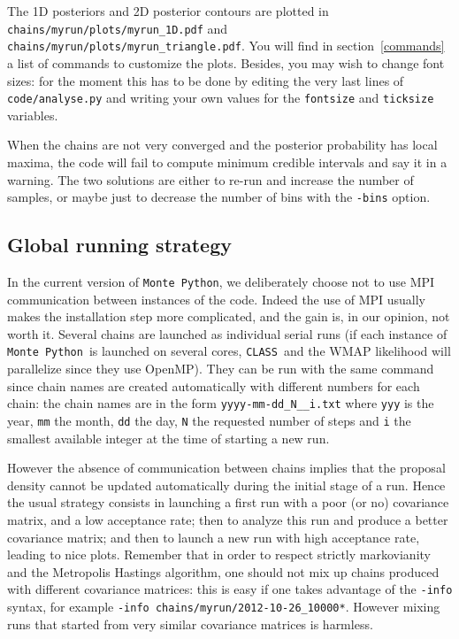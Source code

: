 \documentclass[10pt]{article}
\newcommand{\CLASS}{\texttt{CLASS}}
\newcommand{\MP}{\texttt{Monte Python}}
\begin{document}
The 1D posteriors and 2D posterior contours are plotted in \verb?chains/myrun/plots/myrun_1D.pdf? and \verb?chains/myrun/plots/myrun_triangle.pdf?. You will find in section~\ref{commands} a list of commands to customize the plots. Besides, you may wish to change font sizes: for the moment this has to be done by editing the very last lines of \verb?code/analyse.py? and writing your own values for the \verb?fontsize? and \verb?ticksize? variables.

When the chains are not very converged and the posterior probability has local maxima, the code will fail to compute minimum credible intervals and say it in a warning. The two solutions are either to re-run and increase the number of samples, or maybe just to decrease the number of bins with the \verb?-bins? option.

\subsection{Global running strategy}
     
In the current version of \MP, we deliberately  choose not to use MPI communication between instances of the code. Indeed the use of MPI usually makes the installation step more complicated, and the gain is, in our opinion, not worth it. Several chains are launched as individual serial runs (if each instance of \MP~is launched on several cores, \CLASS~and the WMAP likelihood will parallelize since they use OpenMP). They can be run with the same command since chain names  are created automatically with different numbers for each chain: the chain names are in  the form
\verb?yyyy-mm-dd_N__i.txt? where {\tt yyy} is the year, {\tt mm} the month, {\tt dd} the day, {\tt N} the requested number of steps and {\tt i} the smallest available integer at the time of starting a new run.

However the absence of communication between chains implies that the proposal density cannot be updated automatically during the initial stage of a run. Hence the usual strategy consists in launching a first run with a poor (or no) covariance matrix, and a low acceptance rate; then to analyze this run and produce a better covariance matrix; and then to launch a new run with high acceptance rate, leading to nice plots. Remember that in order to respect strictly markovianity and the Metropolis Hastings algorithm, one should not mix up chains produced with different covariance matrices: this is easy if one takes advantage of the \verb?-info? syntax, for example \verb?-info chains/myrun/2012-10-26_10000*?. However mixing runs that started from very similar covariance matrices is harmless.
\end{document}
